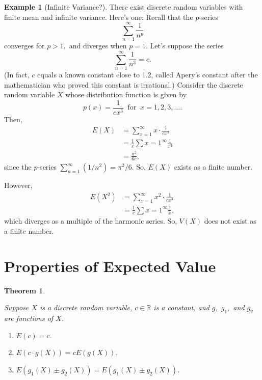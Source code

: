 \documentclass[
]{book}
\providecommand{\tightlist}{%
  \setlength{\itemsep}{0pt}\setlength{\parskip}{0pt}}
\newtheorem{theorem}{Theorem}[chapter]
\theoremstyle{definition}
\theoremstyle{definition}
\newtheorem{example}{Example}[chapter]
\theoremstyle{definition}
\theoremstyle{definition}
\theoremstyle{remark}
\begin{document}
\begin{example}[Infinite Variance?]
\protect\hypertarget{exm:infinite-variance}{}\label{exm:infinite-variance}There exist discrete random variables with finite mean and infinite variance. Here's one: Recall that the \(p\)-series \[\sum_{n=1}^\infty \frac{1}{n^p}\] converges for \(p > 1,\) and diverges when \(p = 1\). Let's suppose the series \[\sum_{n=1}^\infty \frac{1}{n^3} = c.\]
(In fact, \(c\) equals a known constant close to 1.2, called Apery's constant after the mathematician who proved this constant is irrational.) Consider the discrete random variable \(X\) whose distribution function is given by \[p(x) = \frac{1}{cx^3} ~\text{ for }~ x = 1, 2, 3, \ldots.\]
Then,
\begin{align*}
E(X) &= \sum_{x=1}^\infty x \cdot \frac{1}{cx^3}\\
    &= \frac{1}{c} \sum{x=1}^\infty \frac{1}{x^2} \\
    &= \frac{\pi^2}{6c},
\end{align*}
since the \(p\)-series \(\sum_{n=1}^\infty (1/n^2) = \pi^2/6.\) So, \(E(X)\) exists as a finite number.

However,
\begin{align*}
E(X^2) &= \sum_{x=1}^\infty x^2 \cdot \frac{1}{cx^3}\\
    &= \frac{1}{c} \sum{x=1}^\infty \frac{1}{x},
\end{align*}
which diverges as a multiple of the harmonic series. So, \(V(X)\) does not exist as a finite number.
\end{example}

\section{Properties of Expected Value}\label{properties-of-expected-value}

\begin{theorem}
\protect\hypertarget{thm:EV-properties-discrete}{}\label{thm:EV-properties-discrete}

Suppose \(X\) is a discrete random variable, \(c \in \mathbb{R}\) is a constant, and \(g,\) \(g_1,\) and \(g_2\) are functions of \(X\).

\begin{enumerate}
\def\labelenumi{\arabic{enumi}.}
\tightlist
\item
  \(E(c) = c\).
\item
  \(E(c\cdot g(X))= cE(g(X))\).
\item
  \(E(g_1(X) \pm g_2(X)) = E(g_1(X)\pm g_2(X))\).
\end{enumerate}

\end{theorem}
\end{document}
